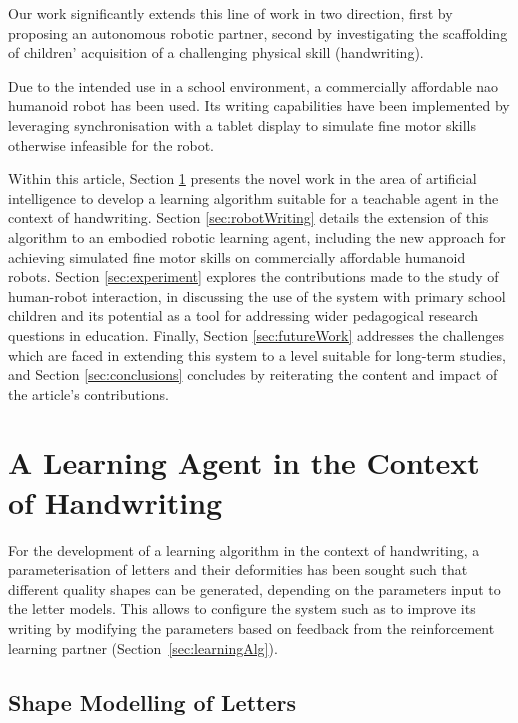 \documentclass{sig-alternate}
\begin{document}
Our work significantly extends this line of work in two direction, first by
proposing an autonomous robotic partner, second by investigating the scaffolding
of children' acquisition of a challenging physical skill (handwriting).

Due to the intended use in a school environment, a commercially
affordable {\sc nao} humanoid robot has been used. Its writing capabilities 
have been implemented by leveraging synchronisation with a tablet display to
simulate fine motor skills otherwise infeasible for the robot. 

Within this article, Section \ref{sec:learningAlgorithm} presents the novel work in the area of
artificial intelligence to develop a learning algorithm suitable for a teachable
agent in the context of handwriting. Section \ref{sec:robotWriting} details the
extension of this algorithm to an embodied robotic learning agent, including the
new approach for achieving simulated fine motor skills on commercially
affordable humanoid robots. Section \ref{sec:experiment} explores the 
contributions made to the study of human-robot interaction, in discussing the
use of the system with primary school children and its potential as a tool for
addressing wider pedagogical research questions in education. Finally, Section \ref{sec:futureWork} addresses the challenges which are faced in extending this system to a level suitable for long-term studies, and Section \ref{sec:conclusions} concludes by reiterating the content and impact of the article's contributions.



\section{A Learning Agent in the Context of Handwriting} \label{sec:learningAlgorithm}

For the development of a learning algorithm in the context of
handwriting, a parameterisation of letters and their deformities has been sought such 
that different quality shapes can be generated, depending on the parameters input to
the letter models. This allows to configure the system such as to improve its writing 
by modifying the parameters based on feedback from the 
reinforcement learning partner (Section~\ref{sec:learningAlg}). 


\subsection{Shape Modelling of Letters} \label{sec:writingGeneration}
\end{document}
